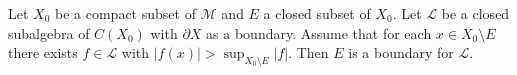 
Let $X_0$ be a compact subset of $\mathcal{M}$ and $E$ a closed subset of $X_0$. Let $\mathcal{L}$ be a closed subalgebra of $C(X_0)$ with $\partial X$ as a boundary. Assume that for each $x \in X_0 \setminus E$ there exists $f \in \mathcal{L}$ with $|f(x)| > \sup_{X_0 \setminus E} |f|$. Then $E$ is a boundary for $\mathcal{L}$.
